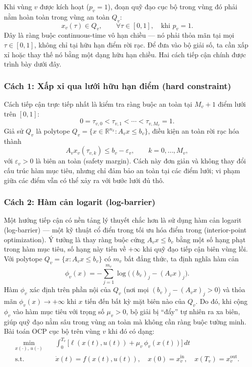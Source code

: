 Khi vùng $v$ được kích hoạt ($p_v=1$), đoạn quỹ đạo cục bộ trong vùng đó phải nằm hoàn toàn trong vùng an toàn $Q_v$:
\begin{equation}
x_v(\tau)\in Q_v,
\qquad \forall \tau\in[0,1],
\quad \text{khi } p_v=1.
\label{eq:region_constraint_ocp}
\end{equation}
Đây là ràng buộc continuous-time vô hạn chiều — nó phải thỏa mãn tại mọi $\tau\in[0,1]$, không chỉ tại hữu hạn điểm rời rạc. Để đưa vào bộ giải số, ta cần xấp xỉ hoặc thay thế nó bằng một dạng hữu hạn chiều. Hai cách tiếp cận chính được trình bày dưới đây.

\subsubsection{Cách 1: Xấp xỉ qua lưới hữu hạn điểm (hard constraint)}

Cách tiếp cận trực tiếp nhất là kiểm tra ràng buộc an toàn tại $M_v+1$ điểm lưới trên $[0,1]$:
\[
0=\tau_{v,0}<\tau_{v,1}<\cdots<\tau_{v,M_v}=1.
\]
Giả sử $Q_v$ là polytope $Q_v=\{x\in\mathbb{R}^{n_x}:A_vx\le b_v\}$, điều kiện an toàn rời rạc hóa thành
\[
A_v x_v(\tau_{v,k})\le b_v-\varepsilon_v,
\qquad k=0,\dots,M_v,
\]
với $\varepsilon_v>0$ là biên an toàn (safety margin). Cách này đơn giản và không thay đổi cấu trúc hàm mục tiêu, nhưng chỉ đảm bảo an toàn tại các điểm lưới; vi phạm giữa các điểm vẫn có thể xảy ra với bước lưới đủ thô.

\subsubsection{Cách 2: Hàm cản logarit (log-barrier)}
\label{subsubsec:log_barrier}

Một hướng tiếp cận có nền tảng lý thuyết chắc hơn là sử dụng hàm cản logarit (log-barrier) — một kỹ thuật cổ điển trong tối ưu hóa điểm trong (interior-point optimization). Ý tưởng là thay ràng buộc cứng $A_v x \le b_v$ bằng một số hạng phạt trong hàm mục tiêu, số hạng này tiến về $+\infty$ khi quỹ đạo tiếp cận biên vùng lồi. Với polytope $Q_v = \{x : A_v x \le b_v\}$ có $m_v$ bất đẳng thức, ta định nghĩa hàm cản
\begin{equation}
\phi_v(x)
= -\sum_{j=1}^{m_v}\log\bigl((b_v)_j-(A_v x)_j\bigr).
\label{eq:log_barrier_def}
\end{equation}
Hàm $\phi_v$ xác định trên phần nội của $Q_v$ (nơi mọi $(b_v)_j-(A_vx)_j>0$) và thỏa mãn $\phi_v(x)\to+\infty$ khi $x$ tiến đến bất kỳ mặt biên nào của $Q_v$. Do đó, khi cộng $\phi_v$ vào hàm mục tiêu với trọng số $\mu_v>0$, bộ giải bị ``đẩy'' tự nhiên ra xa biên, giúp quỹ đạo nằm sâu trong vùng an toàn mà không cần ràng buộc tường minh. Bài toán OCP cục bộ trên vùng $v$ khi đó có dạng:
\[
\begin{aligned}
    \min_{x(\cdot),\,u(\cdot)} \quad
    & \int_{0}^{T_v}\!\bigl[\ell(x(t),u(t)) + \mu_v\,\phi_v(x(t))\bigr]\,dt \\
    \text{s.t.} \quad
    & \dot{x}(t) = f(x(t),u(t)),\quad
      x(0) = x_v^{\mathrm{in}},\quad x(T_v) = x_v^{\mathrm{out}}.
\end{aligned}
\]

